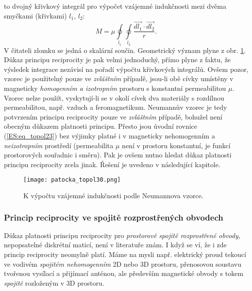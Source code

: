         to dvojný křivkový integrál pro výpočet vzájemné indukčnosti mezi dvěma smyčkami (křivkami) 
        \(l_1\), \(l_2\):
        \begin{equation}\label{ES:eq_topol26}
          M = \mu\oint\limits_{l_1}\oint\limits_{l_2}\frac{\vec{dl_1}\cdot\vec{dl_2}}{r}.
        \end{equation}
        V	čitateli zlomku se jedná o skalární součin. Geometrický význam plyne z obr. 
        \ref{es:fig_patocka_topol30}. Důkaz principu reciprocity je pak velmi jednoduchý, přímo 
        plyne z faktu, že výsledek integrace nezávisí na pořadí výpočtu křivkových integrálů. Ovšem 
        pozor, vzorec je použitelný pouze ve \emph{zvláštním} případě, jsou-li obě cívky umístěny v 
        magneticky \emph{homogenním a izotropním} prostoru s konstantní permeabilitou \(\mu\). 
        Vzorec nelze použít, vyskytují-li se v okolí cívek dva materiály s rozdílnou permeabilitou, 
        např. vzduch a feromagnetikum. Neumannův vzorec je tedy potvrzením principu reciprocity 
        pouze ve \emph{zvláštním} případě, bohužel není obecným důkazem platnosti principu. Přesto 
        jsou úvodní rovnice (\ref{ES:eq_topol23}) bez výjimky platné i v magneticky nehomogenním a 
        \emph{neizotropním} prostředí (permeabilita \(\mu\) není v prostoru konstantní, je funkcí 
        prostorových souřadnic i směru). Pak je ovšem nutno hledat důkaz platnosti principu 
        reciprocity zcela jinak. Řešení je uvedeno v následující kapitole.
        \begin{figure}[ht!]
          \centering  
          \texttt{[image: patocka\_topol30.png]}
          \caption{K výpočtu vzájemné indukčnosti podle Neumannova vzorce. \cite[s.~64]{Patocka4}} 
           \label{es:fig_patocka_topol30}
         \end{figure} 
     
      \subsubsection{Princip reciprocity ve spojitě rozprostřených obvodech}
        Důkaz platnosti principu reciprocity pro \emph{prostorově spojitě rozprostřené obvody}, 
        nepopsatelné diskrétní maticí, není v literatuře znám. I když se ví, že i zde princip 
        reciprocity neomylně platí. Máme na mysli např. elektrický proud tekoucí ve vodivém 
        \emph{spojitém nehomogenním} 2D nebo 3D prostoru, přenosovou soustavu tvořenou vysílací a 
        přijímací anténou, ale především magnetické obvody s tokem \emph{spojitě} rozloženým v 3D 
        prostoru.
        
